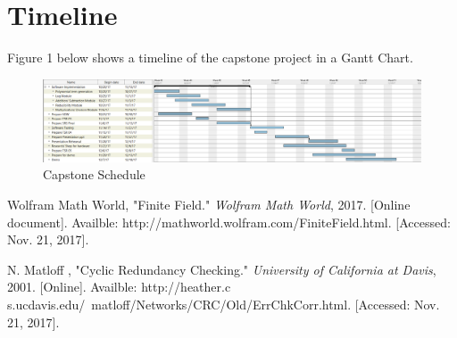 \documentclass[12pt]{extarticle}
\begin{document}
    \section{Timeline} Figure 1 below shows a timeline of the capstone project
    in a Gantt Chart.

    \begin{figure}[h]
        \begin{center}
            \includegraphics[width=1\textwidth]{gantt_chart.png}
            \caption{Capstone Schedule} \label{fig:gantt_chart}
        \end{center}
    \end{figure}

    \begin{thebibliography}{2}
        Wolfram Math World, "Finite Field." \textit{Wolfram Math World},
        2017. [Online document]. Availble:
              http://mathworld.wolfram.com/FiniteField.html. [Accessed:
              Nov. 21, 2017].

        N. Matloff , "Cyclic Redundancy Checking." \textit{University of
           California at Davis}, 2001. [Online]. Availble: http://heather.c
           s.ucdavis.edu/~matloff/Networks/CRC/Old/ErrChkCorr.html.
           [Accessed: Nov. 21, 2017].
    \end{thebibliography}
\end{document}
